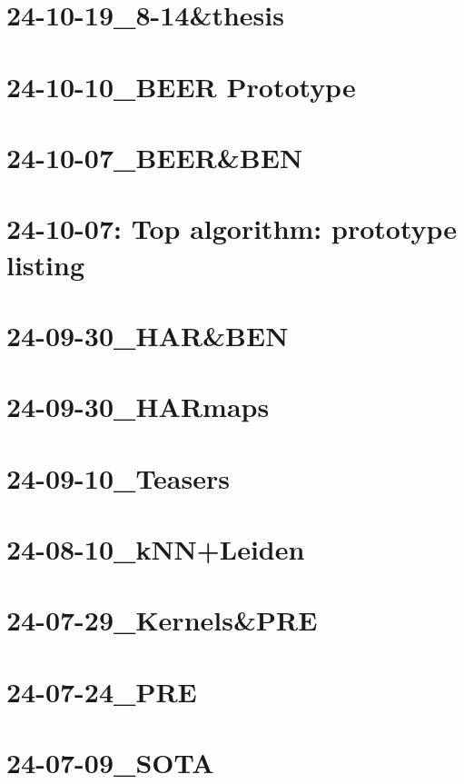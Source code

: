 \documentclass[11pt]{article}
\begin{document}
\clearpage

\tableofcontents


\clearpage

\section{24-10-19\_8-14\&thesis}

\section{24-10-10\_BEER Prototype}

\section{24-10-07\_BEER\&BEN}
 \label{sec:24-10-07_BEER&BEN}
\section{24-10-07: Top algorithm: prototype listing}

\section{24-09-30\_HAR\&BEN}

\section{24-09-30\_HARmaps}

\section{24-09-10\_Teasers}

\section{24-08-10\_kNN+Leiden}

\section{24-07-29\_Kernels\&PRE}

\section{24-07-24\_PRE}

\section{24-07-09\_SOTA}


\begin{appendices}
	
\end{appendices}

\printbibliography
\end{document}
